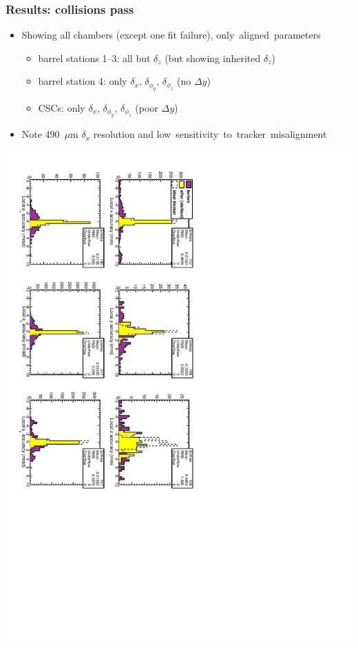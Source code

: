 \documentclass[compress]{beamer}
\begin{document}
\begin{frame}
\frametitle{Results: collisions pass}

\begin{itemize}
\item Showing all chambers (except one fit failure), \mbox{only aligned parameters\hspace{-1 cm}}
\begin{itemize}
\item barrel stations 1--3: all but $\delta_z$ (but showing inherited $\delta_z$)
\item barrel station 4: only $\delta_x$, $\delta_{\phi_y}$, $\delta_{\phi_z}$ (no $\Delta y$)
\item CSCs: only $\delta_x$, $\delta_{\phi_y}$, $\delta_{\phi_z}$ (poor $\Delta y$)
\end{itemize}

\item Note 490~$\mu$m $\delta_x$ resolution and \mbox{low sensitivity to tracker misalignment\hspace{-1 cm}}
\end{itemize}

\includegraphics[height=\linewidth, angle=90]{scenario_cosmics_then_collisions.pdf}
\end{frame}
\end{document}
